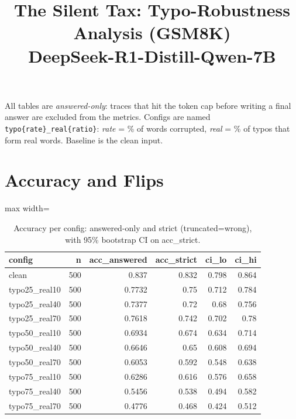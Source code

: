 \documentclass[11pt]{article}
\title{The Silent Tax: Typo-Robustness Analysis (GSM8K)\\\large DeepSeek-R1-Distill-Qwen-7B}
\date{}
\begin{document}
\maketitle
\noindent All tables are \emph{answered-only}: traces that hit the token cap before writing a final answer are excluded from the metrics. Configs are named \texttt{typo\{rate\}\_real\{ratio\}}: \emph{rate} = \% of words corrupted, \emph{real} = \% of typos that form real words. Baseline is the clean input.

\section*{Accuracy and Flips}
\begin{table}[H]
\centering
\caption{Accuracy per config: answered-only and strict (truncated=wrong), with 95\% bootstrap CI on acc\_strict.}
\small
\begin{adjustbox}{max width=\textwidth}
\begin{tabular}{lrrrrr}
\toprule
\textbf{config} & \textbf{n} & \textbf{acc\_answered} & \textbf{acc\_strict} & \textbf{ci\_lo} & \textbf{ci\_hi} \\
\midrule
clean & 500 & 0.837 & 0.832 & 0.798 & 0.864 \\
typo25\_real10 & 500 & 0.7732 & 0.75 & 0.712 & 0.784 \\
typo25\_real40 & 500 & 0.7377 & 0.72 & 0.68 & 0.756 \\
typo25\_real70 & 500 & 0.7618 & 0.742 & 0.702 & 0.78 \\
typo50\_real10 & 500 & 0.6934 & 0.674 & 0.634 & 0.714 \\
typo50\_real40 & 500 & 0.6646 & 0.65 & 0.608 & 0.694 \\
typo50\_real70 & 500 & 0.6053 & 0.592 & 0.548 & 0.638 \\
typo75\_real10 & 500 & 0.6286 & 0.616 & 0.576 & 0.658 \\
typo75\_real40 & 500 & 0.5456 & 0.538 & 0.494 & 0.582 \\
typo75\_real70 & 500 & 0.4776 & 0.468 & 0.424 & 0.512 \\
\bottomrule
\end{tabular}
\end{adjustbox}
\end{table}
\end{document}
